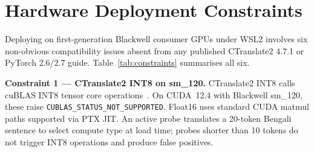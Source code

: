 \documentclass[journal]{IEEEtran}
\begin{document}
\section{Hardware Deployment Constraints}
\label{sec:constraints}

Deploying on first-generation Blackwell consumer GPUs under WSL2 involves
six non-obvious compatibility issues absent from any published CTranslate2 4.7.1
or PyTorch 2.6/2.7 guide.
Table~\ref{tab:constraints} summarises all six.

\begin{table}[htbp]
\caption{Hardware Constraints and Solutions.}
\label{tab:constraints}
\centering
{}
\end{table}

\textbf{Constraint 1 --- CTranslate2 INT8 on sm\_120.}
CTranslate2 INT8 calls cuBLAS INT8 tensor core operations~\cite{dettmers2022llmint8}.
On CUDA~12.4 with Blackwell sm\_120, these raise \texttt{CUBLAS\_STATUS\_NOT\_SUPPORTED}.
Float16 uses standard CUDA matmul paths supported via PTX JIT.
An active probe translates a 20-token Bengali sentence to select compute type at
load time; probes shorter than 10 tokens do not trigger INT8 operations and produce
false positives.
\end{document}
